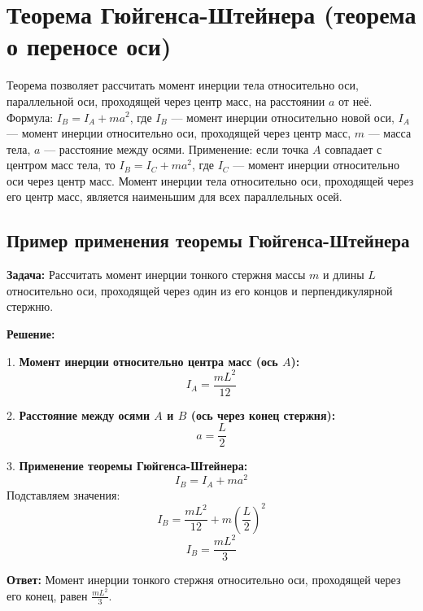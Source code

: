 \documentclass[a4paper]{article}
\begin{document}
	\section{Теорема Гюйгенса-Штейнера (теорема о переносе оси)}
	\begin{flushleft}
		Теорема позволяет рассчитать момент инерции тела относительно оси, параллельной оси, проходящей через центр масс, на расстоянии $a$ от неё. \linebreak \linebreak
		Формула: $I_B = I_A + ma^2$, где $I_B$ — момент инерции относительно новой оси, $I_A$ — момент инерции относительно оси, проходящей через центр масс, $m$ — масса тела, $a$ — расстояние между осями. \linebreak \linebreak
		Применение: если точка $A$ совпадает с центром масс тела, то $I_B = I_C + ma^2$, где $I_C$ — момент инерции относительно оси через центр масс. Момент инерции тела относительно оси, проходящей через его центр масс, является наименьшим для всех параллельных осей.
		\linebreak \linebreak \linebreak
	\end{flushleft}
	
	\subsection*{Пример применения теоремы Гюйгенса-Штейнера}
	
	\textbf{Задача:} Рассчитать момент инерции тонкого стержня массы \( m \) и длины \( L \) относительно оси, проходящей через один из его концов и перпендикулярной стержню.
	
	\textbf{Решение:}
	
	1. \textbf{Момент инерции относительно центра масс (ось \( A \)):}
	\[
	I_A = \frac{m L^2}{12}
	\]
	
	2. \textbf{Расстояние между осями \( A \) и \( B \) (ось через конец стержня):}
	\[
	a = \frac{L}{2}
	\]
	
	3. \textbf{Применение теоремы Гюйгенса-Штейнера:}
	\[
	I_B = I_A + m a^2
	\]
	Подставляем значения:
	\[
	I_B = \frac{m L^2}{12} + m \left( \frac{L}{2} \right)^2
	\]
	\[
	I_B = \frac{m L^2}{3}
	\]
	
	\textbf{Ответ:} Момент инерции тонкого стержня относительно оси, проходящей через его конец, равен \( \frac{m L^2}{3} \).
	
\end{document}
